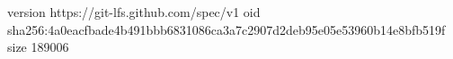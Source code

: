 version https://git-lfs.github.com/spec/v1
oid sha256:4a0eacfbade4b491bbb6831086ca3a7c2907d2deb95e05e53960b14e8bfb519f
size 189006
